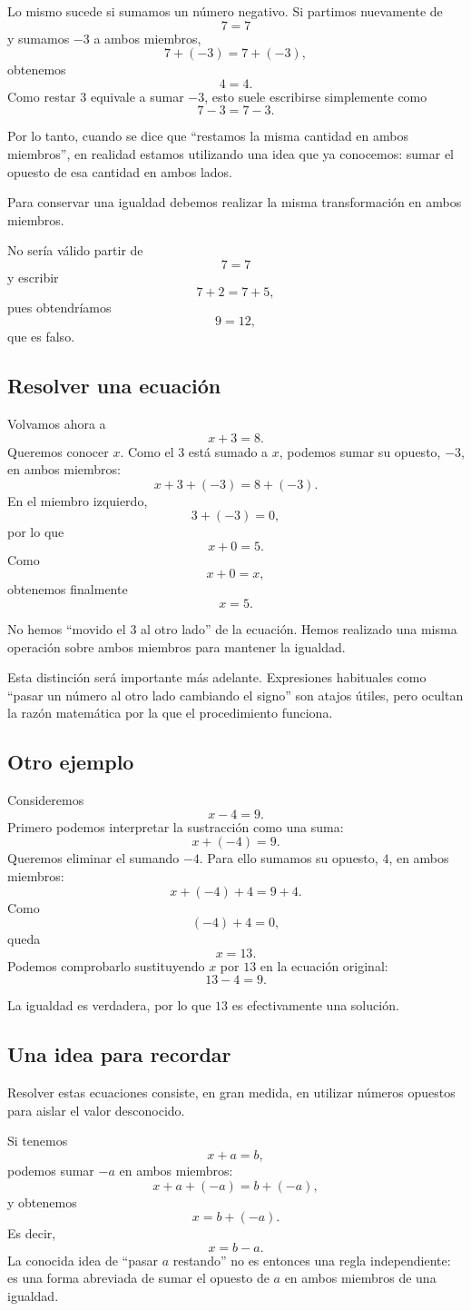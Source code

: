 Lo mismo sucede si sumamos un número negativo. Si partimos nuevamente de
\[
7=7
\]
y sumamos \(-3\) a ambos miembros,
\[
7+(-3)=7+(-3),
\]
obtenemos
\[
4=4.
\]
Como restar \(3\) equivale a sumar \(-3\), esto suele escribirse simplemente como
\[
7-3=7-3.
\]

Por lo tanto, cuando se dice que ``restamos la misma cantidad en ambos miembros'', en realidad estamos utilizando una idea que ya conocemos: sumar el opuesto de esa cantidad en ambos lados.

\begin{note}
Para conservar una igualdad debemos realizar la misma transformación en ambos miembros.

No sería válido partir de
\[
7=7
\]
y escribir
\[
7+2=7+5,
\]
pues obtendríamos
\[
9=12,
\]
que es falso.
\end{note}

\subsection{Resolver una ecuación}

Volvamos ahora a
\[
x+3=8.
\]
Queremos conocer \(x\). Como el \(3\) está sumado a \(x\), podemos sumar su opuesto, \(-3\), en ambos miembros:
\[
x+3+(-3)=8+(-3).
\]
En el miembro izquierdo,
\[
3+(-3)=0,
\]
por lo que
\[
x+0=5.
\]
Como
\[
x+0=x,
\]
obtenemos finalmente
\[
x=5.
\]

No hemos ``movido el \(3\) al otro lado'' de la ecuación. Hemos realizado una misma operación sobre ambos miembros para mantener la igualdad.

Esta distinción será importante más adelante. Expresiones habituales como ``pasar un número al otro lado cambiando el signo'' son atajos útiles, pero ocultan la razón matemática por la que el procedimiento funciona.

\subsection{Otro ejemplo}

Consideremos
\[
x-4=9.
\]
Primero podemos interpretar la sustracción como una suma:
\[
x+(-4)=9.
\]
Queremos eliminar el sumando \(-4\). Para ello sumamos su opuesto, \(4\), en ambos miembros:
\[
x+(-4)+4=9+4.
\]
Como
\[
(-4)+4=0,
\]
queda
\[
x=13.
\]
Podemos comprobarlo sustituyendo \(x\) por \(13\) en la ecuación original:
\[
13-4=9.
\]

La igualdad es verdadera, por lo que \(13\) es efectivamente una solución.

\subsection{Una idea para recordar}

Resolver estas ecuaciones consiste, en gran medida, en utilizar números opuestos para aislar el valor desconocido.

Si tenemos
\[
x+a=b,
\]
podemos sumar \(-a\) en ambos miembros:
\[
x+a+(-a)=b+(-a),
\]
y obtenemos
\[
x=b+(-a).
\]
Es decir,
\[
x=b-a.
\]
La conocida idea de ``pasar \(a\) restando'' no es entonces una regla independiente: es una forma abreviada de sumar el opuesto de \(a\) en ambos miembros de una igualdad.
